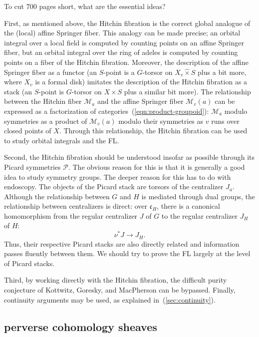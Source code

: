 \documentclass[brochure,english,12pt]{bourbaki}
\theoremstyle{plain}
\def\cc{\mathfrak{c}}
\def\M{{\mathcal M}}
\def\P{{\mathcal P}}
\begin{document}
To cut  $700$ pages short, what are the essential ideas?  

First, as mentioned above, the Hitchin fibration is the correct global
analogue of the (local) affine Springer fiber.  This analogy can be
made precise; an orbital integral over a local field
is computed by counting points on an affine Springer fiber, but an
orbital integral over the ring of adeles is computed by counting
points on a fiber of the Hitchin fibration.  Moreover, the description
of the affine Springer fiber as a functor (an $S$-point is a
$G$-torsor on $X_v \hat\times S$ plus a bit more, where $X_v$ is a
formal disk) imitates the description of the Hitchin fibration as a
stack (an $S$-point is $G$-torsor on $X\times S$ plus a similar bit
more).  The relationship between the Hitchin fiber $\M_a$ and the
affine Springer fiber $\M_v(a)$ can be expressed as a factorization of
categories~(\ref{eqn:product-groupoid}): $\M_a$ modulo symmetries as a
product of $\M_v(a)$ modulo their symmetries as $v$ runs over closed
points of $X$.  Through this relationship, the Hitchin
fibration can be used to study orbital integrals and the FL.

Second, the Hitchin fibration should be understood insofar as possible
through its Picard symmetries $\P$.  The obvious reason for this is
that it is generally a good idea to study symmetry groups.  The deeper
reason for this has to do with endoscopy.  The objects of the Picard
stack are torsors of the centralizer $J_a$.  Although the relationship
between $G$ and $H$ is mediated through dual groups, the relationship
between centralizers is direct: over $\cc_H$, there is a canonical
homomorphism from the regular centralizer $J$ of $G$ to the regular
centralizer $J_H$ of $H$:
\begin{equation}\label{eqn:JH}
\nu^*J\to J_H.
\end{equation}
Thus, their respective Picard stacks  are also
directly related and information passes fluently between them.  We should try to prove the FL
 largely at the level of Picard stacks.

 Third, by working directly with the Hitchin fibration, the difficult
 purity conjecture of Kottwitz, Goresky, and MacPherson can be
 bypassed.  Finally, continuity arguments may be used, as explained in~(\ref{sec:continuity}).



\subsection{perverse cohomology sheaves}
\end{document}
